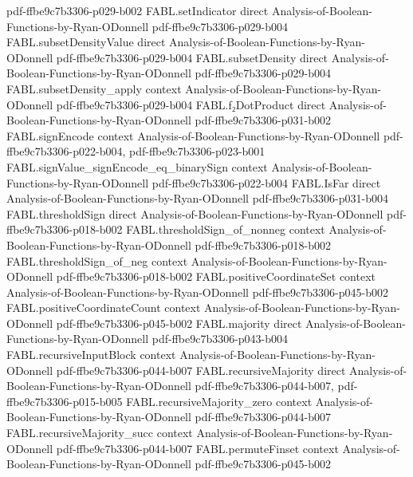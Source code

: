 \begin{theorem}
{    pdf-ffbe9c7b3306-p029-b002}
\proofstep
  {FABL.setIndicator}
  {direct}
  {Analysis-of-Boolean-Functions-by-Ryan-ODonnell}
  {pdf-ffbe9c7b3306-p029-b004}
\proofstep
  {FABL.subsetDensityValue}
  {direct}
  {Analysis-of-Boolean-Functions-by-Ryan-ODonnell}
  {pdf-ffbe9c7b3306-p029-b004}
\proofstep
  {FABL.subsetDensity}
  {direct}
  {Analysis-of-Boolean-Functions-by-Ryan-ODonnell}
  {pdf-ffbe9c7b3306-p029-b004}
\proofstep
  {FABL.subsetDensity_apply}
  {context}
  {Analysis-of-Boolean-Functions-by-Ryan-ODonnell}
  {pdf-ffbe9c7b3306-p029-b004}
\proofstep
  {FABL.f₂DotProduct}
  {direct}
  {Analysis-of-Boolean-Functions-by-Ryan-ODonnell}
  {pdf-ffbe9c7b3306-p031-b002}
\proofstep
  {FABL.signEncode}
  {context}
  {Analysis-of-Boolean-Functions-by-Ryan-ODonnell}
  {pdf-ffbe9c7b3306-p022-b004,
    pdf-ffbe9c7b3306-p023-b001}
\proofstep
  {FABL.signValue_signEncode_eq_binarySign}
  {context}
  {Analysis-of-Boolean-Functions-by-Ryan-ODonnell}
  {pdf-ffbe9c7b3306-p022-b004}
\proofstep
  {FABL.IsFar}
  {direct}
  {Analysis-of-Boolean-Functions-by-Ryan-ODonnell}
  {pdf-ffbe9c7b3306-p031-b004}
\proofstep
  {FABL.thresholdSign}
  {direct}
  {Analysis-of-Boolean-Functions-by-Ryan-ODonnell}
  {pdf-ffbe9c7b3306-p018-b002}
\proofstep
  {FABL.thresholdSign_of_nonneg}
  {context}
  {Analysis-of-Boolean-Functions-by-Ryan-ODonnell}
  {pdf-ffbe9c7b3306-p018-b002}
\proofstep
  {FABL.thresholdSign_of_neg}
  {context}
  {Analysis-of-Boolean-Functions-by-Ryan-ODonnell}
  {pdf-ffbe9c7b3306-p018-b002}
\proofstep
  {FABL.positiveCoordinateSet}
  {context}
  {Analysis-of-Boolean-Functions-by-Ryan-ODonnell}
  {pdf-ffbe9c7b3306-p045-b002}
\proofstep
  {FABL.positiveCoordinateCount}
  {context}
  {Analysis-of-Boolean-Functions-by-Ryan-ODonnell}
  {pdf-ffbe9c7b3306-p045-b002}
\proofstep
  {FABL.majority}
  {direct}
  {Analysis-of-Boolean-Functions-by-Ryan-ODonnell}
  {pdf-ffbe9c7b3306-p043-b004}
\proofstep
  {FABL.recursiveInputBlock}
  {context}
  {Analysis-of-Boolean-Functions-by-Ryan-ODonnell}
  {pdf-ffbe9c7b3306-p044-b007}
\proofstep
  {FABL.recursiveMajority}
  {direct}
  {Analysis-of-Boolean-Functions-by-Ryan-ODonnell}
  {pdf-ffbe9c7b3306-p044-b007,
    pdf-ffbe9c7b3306-p015-b005}
\proofstep
  {FABL.recursiveMajority_zero}
  {context}
  {Analysis-of-Boolean-Functions-by-Ryan-ODonnell}
  {pdf-ffbe9c7b3306-p044-b007}
\proofstep
  {FABL.recursiveMajority_succ}
  {context}
  {Analysis-of-Boolean-Functions-by-Ryan-ODonnell}
  {pdf-ffbe9c7b3306-p044-b007}
\proofstep
  {FABL.permuteFinset}
  {context}
  {Analysis-of-Boolean-Functions-by-Ryan-ODonnell}
  {pdf-ffbe9c7b3306-p045-b002}
\proofstep

\end{theorem}
